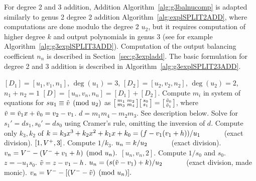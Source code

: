 For degree 2 and 3 addition, Addition Algorithm~\ref{alg:g3balnucomp} is adapted
similarly to genus 2 degree 2 addition
Algorithm~\ref{alg:explSPLIT2ADD}, where computations are done modulo the degree
2 $u_2$, but it requires computation of higher degree $k$ and output polynomials in
genus 3 (see for example Algorithm~\ref{alg:g3explSPLIT3ADD}). Computation of
the output balancing coefficient $n_n$ is described in Section~\ref{sec:g3expladd}.
The basic formulation for degree 2 and 3 addition is described in
Algorithm~\ref{alg:g3explSPLIT23ADD}.

\begin{algorithm}[htbp]
\caption{Genus 3 Split Model Degree 2 and 3 Addition\label{alg:g3explSPLIT23ADD}}
\begin{algorithmic} [1]
\Require $[D_1] = [u_1,v_1,n_1]$, $\deg(u_1) = 3$, $[D_2] = [u_2,v_2,n_2]$, $\deg(u_2) = 2$, $n_1 + n_2 = 1$
\Ensure $[D] = [u_n,v_n,n_n] = [D_1] + [D_2] $.
\algrule
\vspace{-2pt}
\State Compute $m_i$ in system of equations for $su_1\equiv \tilde{v} \pmod{u_2}$ as $ \bigl[ \begin{smallmatrix} m_1 & m_2\\ m_3 & m_4\end{smallmatrix}\bigr] \bigl[ \begin{smallmatrix} s_0\\ s_1 \end{smallmatrix} \bigr ] = \bigl[ \begin{smallmatrix}\tilde{v}_0 \\  \tilde{v}_1\end{smallmatrix} \bigr ]$, where $\tilde{v} = \tilde{v}_1x + \tilde{v}_0 = v_2 - v_1$.
\State $d = m_1m_4 - m_2m_3$.
    \State See description below.
\EndIf
\State Solve for $s_1' = ds_1, s_0' = ds_0$ using Cramer's rule, omitting the inversion of $d$.
\State Compute only $k_3, k_2$ of $k = k_3x^3 + k_2x^2 + k_1x + k_0 = (f - v_1(v_1 + h))/u_1 \quad\quad\quad$ (exact division).  
         \Return $[1,V^{+},3]$.
        \Else \hspace{3pt} Compute $1/k_3$.
            \State $u_n = k/u_2 \quad\quad\quad$ (exact division).
            \State $v_n = V^{-} - (V^{-} + v_1 + h) \pmod{u_n}.$
            \State \Return $[u_n,v_n,2]$.
        \EndIf
    \Else \hspace{3pt} Compute $1/s_0$ and $s_0$.
        \State $z = -u_1s_0$.
        \State $\tilde{v} = z - v_1 - h$.
        \State $u_n = (s(\tilde{v} - v_1) + k)/u_2 \quad\quad\quad$ (exact division, made monic).
        \State $v_n = V^{-} - [(V^{-} - \tilde{v}) \pmod{u_n}].$

\end{algorithmic}
\end{algorithm}
